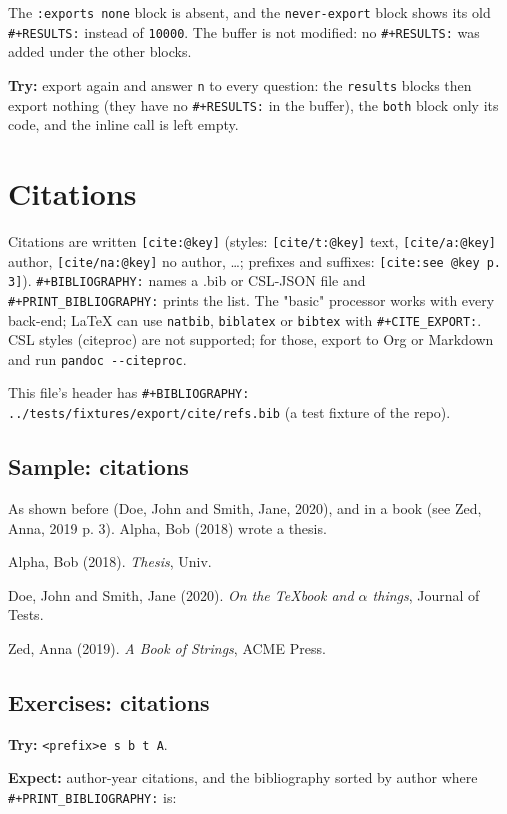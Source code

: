 The \texttt{:exports none} block is absent, and the \texttt{never-export} block shows
its old \texttt{\#+RESULTS:} instead of \texttt{10000}. The buffer is not modified: no
\texttt{\#+RESULTS:} was added under the other blocks.

\textbf{Try:} export again and answer \texttt{n} to every question: the \texttt{results}
blocks then export nothing (they have no \texttt{\#+RESULTS:} in the buffer), the
\texttt{both} block only its code, and the inline call is left empty.
\section{Citations}
\label{sec:org1f202bf}
Citations are written \texttt{[cite:@key]} (styles: \texttt{[cite/t:@key]} text,
\texttt{[cite/a:@key]} author, \texttt{[cite/na:@key]} no author, \ldots{}; prefixes and
suffixes: \texttt{[cite:see @key p. 3]}). \texttt{\#+BIBLIOGRAPHY:} names a .bib or
CSL-JSON file and \texttt{\#+PRINT\_BIBLIOGRAPHY:} prints the list. The "basic"
processor works with every back-end; \LaTeX{} can use \texttt{natbib}, \texttt{biblatex} or
\texttt{bibtex} with \texttt{\#+CITE\_EXPORT:}. CSL styles (citeproc) are not supported;
for those, export to Org or Markdown and run \texttt{pandoc -{}-{}citeproc}.

This file's header has \texttt{\#+BIBLIOGRAPHY: ../tests/fixtures/export/cite/refs.bib}
(a test fixture of the repo).
\subsection{Sample: citations}
\label{sec:orgc16cabf}
As shown before (Doe, John and Smith, Jane, 2020), and in a book (see Zed, Anna, 2019 p. 3).
Alpha, Bob (2018) wrote a thesis.

\noindent
Alpha, Bob (2018). \emph{Thesis}, Univ.

\noindent
Doe, John and Smith, Jane (2020). \emph{On the {TeX}book and $\alpha$ \alpha{} things}, Journal of Tests.

\noindent
Zed, Anna (2019). \emph{A Book of Strings}, ACME Press.
\subsection{Exercises: citations}
\label{sec:orgcd7cf1d}
\textbf{Try:} \texttt{<prefix>e s b t A}.

\textbf{Expect:} author-year citations, and the bibliography sorted by author
where \texttt{\#+PRINT\_BIBLIOGRAPHY:} is:

